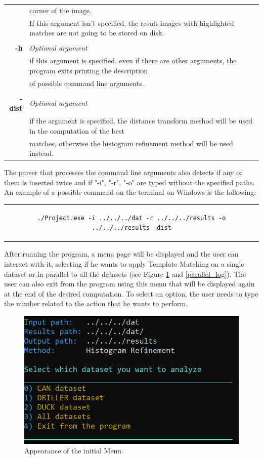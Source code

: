 \documentclass{article}
\begin{document}
\begin{table}[H]
\begin{tabular}{rl}
&{corner of the image.} \\
& {If this argument isn't specified, the result images with highlighted matches are not going to be stored on disk.}\\
&\\
\textbf{-h} & {\textit{Optional argument}}\\
& {if this argument is specified, even if there are other arguments, the program exits printing the description}\\
&{of possible command line arguments.}\\
&\\
\textbf{-dist} & {\textit{Optional argument}}\\
& {if the argument is specified, the distance transform method will be used in the computation of the best}\\
&{matches, otherwise the histogram refinement method will be used instead.}\\
\end{tabular}
\end{table}
The parser that processes the command line arguments also detects if any of them is inserted twice and if "-i", "-r", "-o" are typed without the specified paths. An example of a possible command on the terminal on Windows is the following:
\begin{center}
\begin{tabular}{c}
\begin{lstlisting}[linewidth=390pt, basicstyle=\footnotesize\sffamily,]
./Project.exe -i ../../../dat -r ../../../results -o ../../../results -dist
\end{lstlisting}
\end{tabular}
\end{center}
After running the program, a menu page will be displayed and the user can interact with it, selecting if he wants to apply Template Matching on a single dataset or in parallel to all the datasets (see Figure \ref{menu} and \ref{parallel_log}). The user can also exit from the program using this menu that will be displayed again at the end of the desired computation. To select an option, the user needs to type the number related to the action that he wants to perform.
\begin{figure}[H]
  \centering
  \includegraphics[width=.5\linewidth]{Images/menu.png}
\caption{Appearance of the initial Menu.}
\label{menu}
\end{figure}
\end{document}
